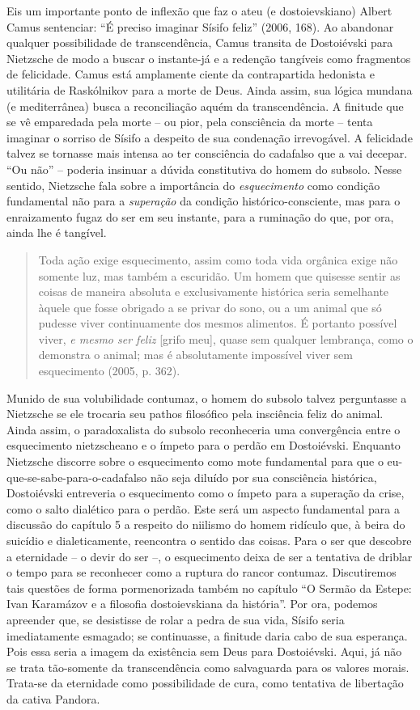 Eis um importante ponto de inflexão que faz o ateu (e dostoievskiano)
Albert Camus sentenciar: ``É preciso imaginar Sísifo feliz'' (2006,
168). Ao abandonar qualquer possibilidade de transcendência, Camus
transita de Dostoiévski para Nietzsche de modo a buscar o instante-já e
a redenção tangíveis como fragmentos de felicidade. Camus está
amplamente ciente da contrapartida hedonista e utilitária de Raskólnikov
para a morte de Deus. Ainda assim, sua lógica mundana (e mediterrânea)
busca a reconciliação aquém da transcendência. A finitude que se vê
emparedada pela morte -- ou pior, pela consciência da morte -- tenta
imaginar o sorriso de Sísifo a despeito de sua condenação irrevogável. A
felicidade talvez se tornasse mais intensa ao ter consciência do
cadafalso que a vai decepar. ``Ou não'' -- poderia insinuar a dúvida
constitutiva do homem do subsolo. Nesse sentido, Nietzsche fala sobre a
importância do \emph{esquecimento} como condição fundamental não para a
\emph{superação} da condição histórico-consciente, mas para o
enraizamento fugaz do ser em seu instante, para a ruminação do que, por
ora, ainda lhe é tangível.

\begin{quote}
Toda ação exige esquecimento, assim como toda vida orgânica exige não
somente luz, mas também a escuridão. Um homem que quisesse sentir as
coisas de maneira absoluta e exclusivamente histórica seria semelhante
àquele que fosse obrigado a se privar do sono, ou a um animal que só
pudesse viver continuamente dos mesmos alimentos. É portanto possível
viver, \emph{e mesmo ser feliz} {[}grifo meu{]}, quase sem qualquer
lembrança, como o demonstra o animal; mas é absolutamente impossível
viver sem esquecimento (2005, p. 362).
\end{quote}

Munido de sua volubilidade contumaz, o homem do subsolo talvez
perguntasse a Nietzsche se ele trocaria seu pathos filosófico pela
insciência feliz do animal. Ainda assim, o paradoxalista do subsolo
reconheceria uma convergência entre o esquecimento nietzscheano e o
ímpeto para o perdão em Dostoiévski. Enquanto Nietzsche discorre sobre o
esquecimento como mote fundamental para que o
eu-que-se-sabe-para-o-cadafalso não seja diluído por sua consciência
histórica, Dostoiévski entreveria o esquecimento como o ímpeto para a
superação da crise, como o salto dialético para o perdão. Este será um
aspecto fundamental para a discussão do capítulo 5 a respeito do
niilismo do homem ridículo que, à beira do suicídio e dialeticamente,
reencontra o sentido das coisas. Para o ser que descobre a eternidade --
o devir do ser --, o esquecimento deixa de ser a tentativa de driblar o
tempo para se reconhecer como a ruptura do rancor contumaz. Discutiremos
tais questões de forma pormenorizada também no capítulo ``O Sermão da
Estepe: Ivan Karamázov e a filosofia dostoievskiana da história''. Por
ora, podemos apreender que, se desistisse de rolar a pedra de sua vida,
Sísifo seria imediatamente esmagado; se continuasse, a finitude daria
cabo de sua esperança. Pois essa seria a imagem da existência sem Deus
para Dostoiévski. Aqui, já não se trata tão-somente da transcendência
como salvaguarda para os valores morais. Trata-se da eternidade como
possibilidade de cura, como tentativa de libertação da cativa Pandora.

